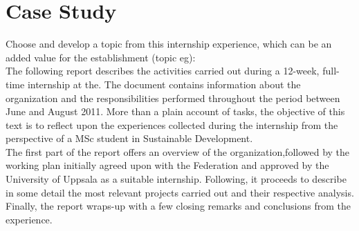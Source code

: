 \documentclass[12pt,onecolumn]{IEEEtran}
\begin{document}
\newpage
\section{\textbf{Case Study}}

Choose and develop a topic from this internship experience, which can be
an added value for the establishment (topic eg):\\

The following report describes the activities carried out during a 12-week, full-time internship at the. The document contains information about the organization and the responsibilities performed throughout the period between June and August 2011. More than a plain account of tasks, the objective of this text is to reflect upon the experiences collected during the internship from the perspective of a MSc student in
Sustainable Development.\\

The first part of the report offers an overview of the organization,followed by the working plan initially agreed upon with the Federation and approved by the University of Uppsala as a suitable internship. Following, it proceeds to describe in some detail the most relevant projects carried out and their respective analysis. Finally, the report
wraps-up with a few closing remarks and conclusions from the experience.



\newpage


\renewcommand\refname{Reference}
\small


\end{document}
